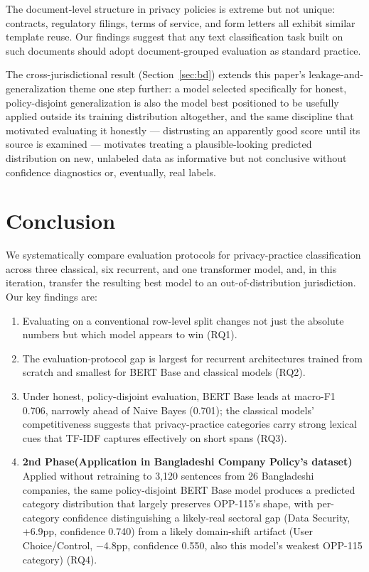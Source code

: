 \documentclass[11pt]{article}
\begin{document}
The document-level structure in privacy policies is extreme but not unique: contracts, regulatory filings, terms of service, and form letters all exhibit similar template reuse. Our findings suggest that any text classification task built on such documents should adopt document-grouped evaluation as standard practice.

The cross-jurisdictional result (Section~\ref{sec:bd}) extends this paper's leakage-and-generalization theme one step further: a model selected specifically for honest, policy-disjoint generalization is also the model best positioned to be usefully applied outside its training distribution altogether, and the same discipline that motivated evaluating it honestly --- distrusting an apparently good score until its source is examined --- motivates treating a plausible-looking predicted distribution on new, unlabeled data as informative but not conclusive without confidence diagnostics or, eventually, real labels.

\section{Conclusion}
\label{sec:conclusion}

We systematically compare evaluation protocols for privacy-practice classification across three classical, six recurrent, and one transformer model, and, in this iteration, transfer the resulting best model to an out-of-distribution jurisdiction. Our key findings are:

\begin{enumerate}
\item Evaluating on a conventional row-level split changes not just the absolute numbers but which model appears to win (RQ1).
\item The evaluation-protocol gap is largest for recurrent architectures trained from scratch and smallest for BERT Base and classical models (RQ2).
\item Under honest, policy-disjoint evaluation, BERT Base leads at macro-F1 0.706, narrowly ahead of Naive Bayes (0.701); the classical models' competitiveness suggests that privacy-practice categories carry strong lexical cues that TF-IDF captures effectively on short spans (RQ3).
\item \textbf{2nd Phase(Application in Bangladeshi Company Policy's dataset)} Applied without retraining to 3,120 sentences from 26 Bangladeshi companies, the same policy-disjoint BERT Base model produces a predicted category distribution that largely preserves OPP-115's shape, with per-category confidence distinguishing a likely-real sectoral gap (Data Security, +6.9pp, confidence 0.740) from a likely domain-shift artifact (User Choice/Control, $-$4.8pp, confidence 0.550, also this model's weakest OPP-115 category) (RQ4).
\end{enumerate}
\end{document}
